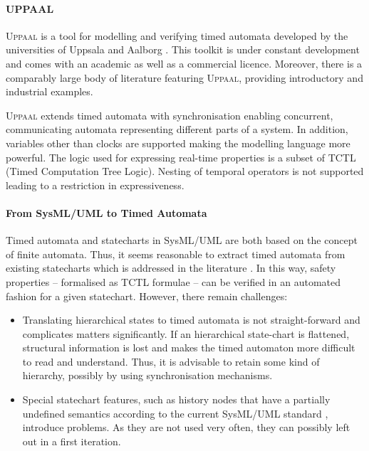 \documentclass{template/openetcs_report}
\begin{document}
\paragraph{UPPAAL}

\textsc{Uppaal} is a tool for modelling and verifying timed automata developed by the universities of Uppsala and Aalborg \cite{UppaalTutorial04}. This toolkit is under constant development and comes with an academic as well as a commercial licence. Moreover, there is a comparably large body of literature featuring \textsc{Uppaal}, providing introductory and industrial examples. 

\textsc{Uppaal} extends timed automata with synchronisation enabling concurrent, communicating automata representing different parts of a system. In addition, variables other than clocks are supported making the modelling language more powerful. The logic used for expressing real-time properties is a subset of TCTL (Timed Computation Tree Logic). Nesting of temporal operators is not supported leading to a restriction in expressiveness.

\paragraph{From SysML/UML to Timed Automata}

Timed automata and statecharts in SysML/UML are both based on the concept of finite automata. Thus, it seems reasonable to extract timed automata from existing statecharts which is addressed in the literature \cite{David2002, Knapp2002, Jensen2004}. In this way, safety properties -- formalised as TCTL formulae -- can be verified in an automated fashion for a given statechart. However, there remain challenges:
\begin{itemize}
\item Translating hierarchical states to timed automata is not straight-forward and complicates matters significantly. If an hierarchical state-chart is flattened, structural information is lost and makes the timed automaton more difficult to read and understand. Thus, it is advisable to retain some kind of hierarchy, possibly by using synchronisation mechanisms.
\item Special statechart features, such as history nodes that have a partially undefined semantics according to the current SysML/UML standard \cite{fecher_29_2005}, introduce problems. As they are not used very often, they can possibly left out in a first iteration.
\end{itemize}
\end{document}
